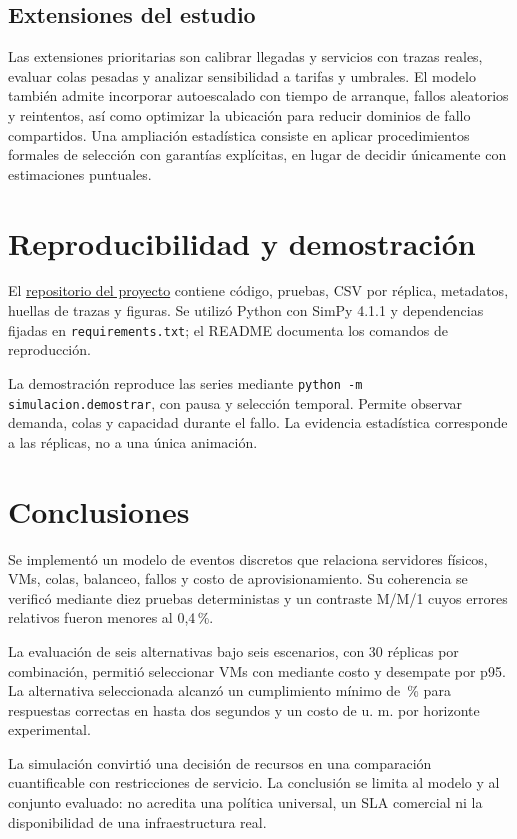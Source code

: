 \subsection{Extensiones del estudio}
Las extensiones prioritarias son calibrar llegadas y servicios con trazas reales, evaluar colas pesadas y analizar sensibilidad a tarifas y umbrales. El modelo también admite incorporar autoescalado con tiempo de arranque, fallos aleatorios y reintentos, así como optimizar la ubicación para reducir dominios de fallo compartidos. Una ampliación estadística consiste en aplicar procedimientos formales de selección con garantías explícitas, en lugar de decidir únicamente con estimaciones puntuales.

\section{Reproducibilidad y demostración}
El \href{https://github.com/francospz-try/Articulo_Optimizacion_Cloud_Overleaf}{repositorio del proyecto} contiene código, pruebas, CSV por réplica, metadatos, huellas de trazas y figuras. Se utilizó Python con SimPy 4.1.1 y dependencias fijadas en \texttt{requirements.txt}; el README documenta los comandos de reproducción.

La demostración reproduce las series mediante \texttt{python -m simulacion.demostrar}, con pausa y selección temporal. Permite observar demanda, colas y capacidad durante el fallo. La evidencia estadística corresponde a las réplicas, no a una única animación.

\section{Conclusiones}
Se implementó un modelo de eventos discretos que relaciona servidores físicos, VMs, colas, balanceo, fallos y costo de aprovisionamiento. Su coherencia se verificó mediante diez pruebas deterministas y un contraste M/M/1 cuyos errores relativos fueron menores al 0,4\,\%.

La evaluación de seis alternativas bajo seis escenarios, con 30 réplicas por combinación, permitió seleccionar \ElegidaVM{} VMs con \ElegidaPolitica{} mediante costo y desempate por p95. La alternativa seleccionada alcanzó un cumplimiento mínimo de \ElegidaG{}\,\% para respuestas correctas en hasta dos segundos y un costo de \ElegidaCosto{} u. m. por horizonte experimental.

La simulación convirtió una decisión de recursos en una comparación cuantificable con restricciones de servicio. La conclusión se limita al modelo y al conjunto evaluado: no acredita una política universal, un SLA comercial ni la disponibilidad de una infraestructura real.
